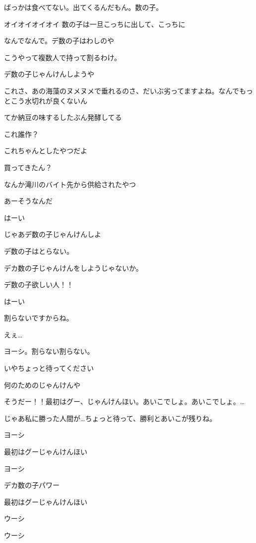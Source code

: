 \begin{multicols}{3}
ばっかは食べてない。出てくるんだもん。数の子。

オイオイオイオイ 数の子は一旦こっちに出して、こっちに

なんでなんで。デ数の子はわしのや

こうやって複数人で持って割るわけ。

デ数の子じゃんけんしようや

これさ、あの海藻のヌメヌメで垂れるのさ、だいぶ劣ってますよね。なんでもっとこう水切れが良くないん

てか納豆の味するしたぶん発酵してる

これ誰作？

これちゃんとしたやつだよ

買ってきたん？

なんか滝川のバイト先から供給されたやつ

あーそうなんだ

はーい

じゃあデ数の子じゃんけんしよ

デ数の子はとらない。

デカ数の子じゃんけんをしようじゃないか。

デ数の子欲しい人！！

はーい

割らないですからね。

えぇ…

ヨーシ。割らない割らない。

いやちょっと待ってください

何のためのじゃんけんや

そうだー！！最初はグー、じゃんけんほい。あいこでしょ。あいこでしょ。…

じゃあ私に勝った人間が…ちょっと待って、勝利とあいこが残りね。

ヨーシ

最初はグーじゃんけんほい

ヨーシ

デカ数の子パワー

最初はグーじゃんけんほい

ウーシ

ウーシ


\end{multicols}
